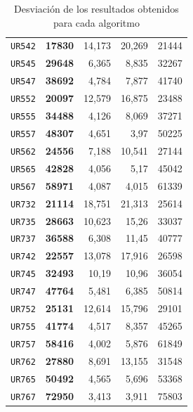 \documentclass[11pt]{article}
\begin{document}
\begin{table}[htbp]
\begin{center}
\begin{tabular}{|r|r|r|r|r|}
   \texttt{UR542} & \textbf{17830} & 14,173 & 20,269 & 21444 \\
   \texttt{UR545} & \textbf{29648} & 6,365 & 8,835 & 32267 \\
   \texttt{UR547} & \textbf{38692} & 4,784 & 7,877 & 41740 \\
   \texttt{UR552} & \textbf{20097} & 12,579 & 16,875 & 23488 \\
   \texttt{UR555} & \textbf{34488} & 4,126 & 8,069 & 37271 \\
   \texttt{UR557} & \textbf{48307} & 4,651 & 3,97 & 50225 \\
   \texttt{UR562} & \textbf{24556} & 7,188 & 10,541 & 27144 \\
   \texttt{UR565} & \textbf{42828} & 4,056 & 5,17 & 45042 \\
   \texttt{UR567} & \textbf{58971} & 4,087 & 4,015 & 61339 \\
   \texttt{UR732} & \textbf{21114} & 18,751 & 21,313 & 25614 \\
   \texttt{UR735} & \textbf{28663} & 10,623 & 15,26 & 33037 \\
   \texttt{UR737} & \textbf{36588} & 6,308 & 11,45 & 40777 \\
   \texttt{UR742} & \textbf{22557} & 13,078 & 17,916 & 26598 \\
   \texttt{UR745} & \textbf{32493} & 10,19 & 10,96 & 36054 \\
   \texttt{UR747} & \textbf{47764} & 5,481 & 6,385 & 50814 \\
   \texttt{UR752} & \textbf{25131} & 12,614 & 15,796 & 29101 \\
   \texttt{UR755} & \textbf{41774} & 4,517 & 8,357 & 45265 \\
   \texttt{UR757} & \textbf{58416} & 4,002 & 5,876 & 61849 \\
   \texttt{UR762} & \textbf{27880} & 8,691 & 13,155 & 31548 \\
   \texttt{UR765} & \textbf{50492} & 4,565 & 5,696 & 53368 \\
   \texttt{UR767} & \textbf{72950} & 3,413 & 3,911 & 75803 \\ \hline
   \end{tabular}
   \end{center}
   \caption{Desviación de los resultados obtenidos para cada algoritmo}
   \label{tablaDesv}
\end{table}   
\end{document}
